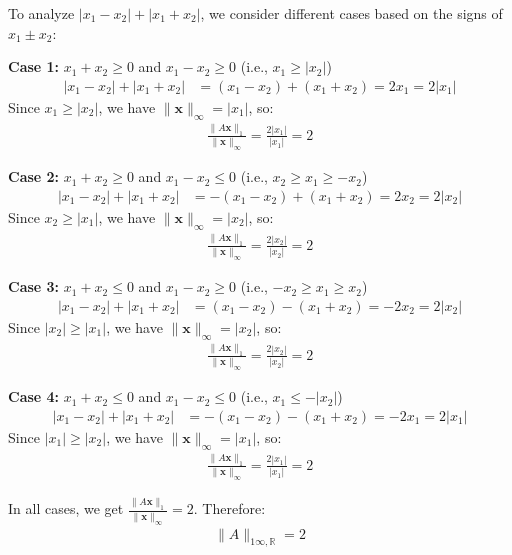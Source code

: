 To analyze $|x_1 - x_2| + |x_1 + x_2|$, we consider different cases based on the signs of $x_1 \pm x_2$:

\textbf{Case 1:} $x_1 + x_2 \geq 0$ and $x_1 - x_2 \geq 0$ (i.e., $x_1 \geq |x_2|$)
\begin{align*}
    |x_1 - x_2| + |x_1 + x_2| & = (x_1 - x_2) + (x_1 + x_2) = 2x_1 = 2|x_1|
\end{align*}
Since $x_1 \geq |x_2|$, we have $\|\mathbf{x}\|_\infty = |x_1|$, so:
\begin{align*}
    \frac{\|A\mathbf{x}\|_1}{\|\mathbf{x}\|_\infty} = \frac{2|x_1|}{|x_1|} = 2
\end{align*}

\textbf{Case 2:} $x_1 + x_2 \geq 0$ and $x_1 - x_2 \leq 0$ (i.e., $x_2 \geq x_1 \geq -x_2$)
\begin{align*}
    |x_1 - x_2| + |x_1 + x_2| & = -(x_1 - x_2) + (x_1 + x_2) = 2x_2 = 2|x_2|
\end{align*}
Since $x_2 \geq |x_1|$, we have $\|\mathbf{x}\|_\infty = |x_2|$, so:
\begin{align*}
    \frac{\|A\mathbf{x}\|_1}{\|\mathbf{x}\|_\infty} = \frac{2|x_2|}{|x_2|} = 2
\end{align*}

\textbf{Case 3:} $x_1 + x_2 \leq 0$ and $x_1 - x_2 \geq 0$ (i.e., $-x_2 \geq x_1 \geq x_2$)
\begin{align*}
    |x_1 - x_2| + |x_1 + x_2| & = (x_1 - x_2) - (x_1 + x_2) = -2x_2 = 2|x_2|
\end{align*}
Since $|x_2| \geq |x_1|$, we have $\|\mathbf{x}\|_\infty = |x_2|$, so:
\begin{align*}
    \frac{\|A\mathbf{x}\|_1}{\|\mathbf{x}\|_\infty} = \frac{2|x_2|}{|x_2|} = 2
\end{align*}

\textbf{Case 4:} $x_1 + x_2 \leq 0$ and $x_1 - x_2 \leq 0$ (i.e., $x_1 \leq -|x_2|$)
\begin{align*}
    |x_1 - x_2| + |x_1 + x_2| & = -(x_1 - x_2) - (x_1 + x_2) = -2x_1 = 2|x_1|
\end{align*}
Since $|x_1| \geq |x_2|$, we have $\|\mathbf{x}\|_\infty = |x_1|$, so:
\begin{align*}
    \frac{\|A\mathbf{x}\|_1}{\|\mathbf{x}\|_\infty} = \frac{2|x_1|}{|x_1|} = 2
\end{align*}

In all cases, we get $\frac{\|A\mathbf{x}\|_1}{\|\mathbf{x}\|_\infty} = 2$. Therefore:
\begin{align*}
    \|A\|_{1\infty,\mathbb{R}} = 2
\end{align*}

